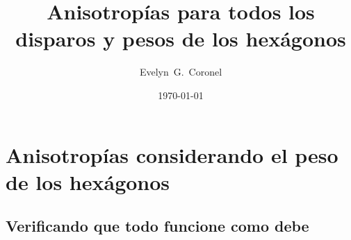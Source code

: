 



\title{Anisotropías para todos los disparos y pesos de los hexágonos}
\author{Evelyn~G.~Coronel}


\date[]{\lowercase{\today}} %


\maketitle

%
%



\section{Anisotropías  considerando el peso de los hexágonos}

\subsection{Verificando que todo funcione como debe}


